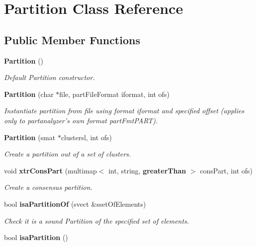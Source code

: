 \section{Partition Class Reference}
\label{classPartition}
\subsection*{Public Member Functions}
\begin{CompactItemize}
\item 
{\bf Partition} ()
\begin{CompactList}\small\item\em Default Partition constructor. \item\end{CompactList}\item 
{\bf Partition} (char $\ast$file, part\-File\-Format iformat, int ofs)\label{classPartition_a1}

\begin{CompactList}\small\item\em Instantiate partition from file using format iformat and specified offset (applies only to partanalyzer's own format part\-Fmt\-PART). \item\end{CompactList}\item 
{\bf Partition} (smat $\ast$clustersl, int ofs)\label{classPartition_a2}

\begin{CompactList}\small\item\em Create a partition out of a set of clusters. \item\end{CompactList}\item 
void {\bf xtr\-Cons\-Part} (multimap$<$ int, string, {\bf greater\-Than} $>$ cons\-Part, int ofs)\label{classPartition_a3}

\begin{CompactList}\small\item\em Create a consensus partition. \item\end{CompactList}\item 
bool {\bf isa\-Partition\-Of} (svect \&sset\-Of\-Elements)
\begin{CompactList}\small\item\em Check it is a sound Partition of the specified set of elements. \item\end{CompactList}\item 
bool {\bf isa\-Partition} ()\label{classPartition_a5}


\end{CompactItemize}
